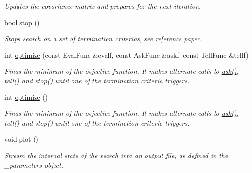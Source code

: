 \begin{DoxyCompactItemize}
\begin{DoxyCompactList}\small\item\em Updates the covariance matrix and prepares for the next iteration. \end{DoxyCompactList}\item 
bool \hyperlink{classlibcmaes_1_1CMAStrategy_adc87b9c500959c800b6bc93d89432ecc}{stop} ()
\begin{DoxyCompactList}\small\item\em Stops search on a set of termination criterias, see reference paper. \end{DoxyCompactList}\item 
int \hyperlink{classlibcmaes_1_1CMAStrategy_a920d0459bf636132528e81736175a1d9}{optimize} (const Eval\-Func \&evalf, const Ask\-Func \&askf, const Tell\-Func \&tellf)
\begin{DoxyCompactList}\small\item\em Finds the minimum of the objective function. It makes alternate calls to \hyperlink{classlibcmaes_1_1CMAStrategy_ab7266bc50732458ffcab690bc26380e6}{ask()}, \hyperlink{classlibcmaes_1_1CMAStrategy_a03d9a4f9338ccd55141323ca309dbdfa}{tell()} and \hyperlink{classlibcmaes_1_1CMAStrategy_adc87b9c500959c800b6bc93d89432ecc}{stop()} until one of the termination criteria triggers. \end{DoxyCompactList}\item 
int \hyperlink{classlibcmaes_1_1CMAStrategy_a68cb0023f51e2824758b1bd1c7512f39}{optimize} ()
\begin{DoxyCompactList}\small\item\em Finds the minimum of the objective function. It makes alternate calls to \hyperlink{classlibcmaes_1_1CMAStrategy_ab7266bc50732458ffcab690bc26380e6}{ask()}, \hyperlink{classlibcmaes_1_1CMAStrategy_a03d9a4f9338ccd55141323ca309dbdfa}{tell()} and \hyperlink{classlibcmaes_1_1CMAStrategy_adc87b9c500959c800b6bc93d89432ecc}{stop()} until one of the termination criteria triggers. \end{DoxyCompactList}\item 
\hypertarget{classlibcmaes_1_1CMAStrategy_a5e56719b620697538d5abe52b5f59b67}{void \hyperlink{classlibcmaes_1_1CMAStrategy_a5e56719b620697538d5abe52b5f59b67}{plot} ()}\label{classlibcmaes_1_1CMAStrategy_a5e56719b620697538d5abe52b5f59b67}

\begin{DoxyCompactList}\small\item\em Stream the internal state of the search into an output file, as defined in the \-\_\-parameters object. \end{DoxyCompactList}\end{DoxyCompactItemize}
